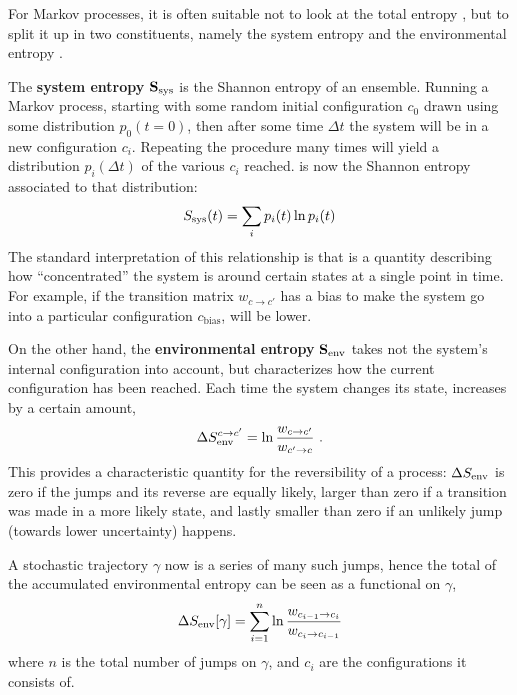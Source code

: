 For Markov processes, it is often suitable not to look at the total entropy \STot{}, but to split it up in two constituents, namely the system entropy \SSys{} and the environmental entropy \SEnv{}.

The \textbf{system entropy} \(\mathbf{S_\text{sys}{}}\) is the Shannon entropy of an ensemble. Running a Markov process, starting with some random initial configuration \(c_0\) drawn using some distribution \(p_0(t=0)\), then after some time \(\Delta t\) the system will be in a new configuration \(c_i\). Repeating the procedure many times will yield a distribution \(p_i(\Delta t)\) of the various \(c_i\) reached. \SSys{} is now the Shannon entropy associated to that distribution:
%
\begin{align}
	S_\text{sys}(t) = \sum_i p_i(t)\ln p_i(t)
\end{align}
%
The standard interpretation of this relationship is that \SSys{} is a quantity describing how ``concentrated'' the system is around certain states at a single point in time. For example, if the transition matrix \(w_{c\to c'}\) has a bias to make the system go into a particular configuration \(c_\text{bias}\), \SSys will be lower.

On the other hand, the \textbf{environmental entropy} \(\mathbf{S_\text{env}{}}\) takes not the system's internal configuration into account, but characterizes how the current configuration has been reached. Each time the system changes its state, \SEnv{} increases by a certain amount,
%
\begin{align}
	\Delta S_\text{env}^{c\to c'} = \ln\frac{w_{c\to c'}}{w_{c'\to c}} ~.
\end{align}
%
This provides a characteristic quantity for the reversibility of a process: \(\Delta S_\text{env}\) is zero if the jumps and its reverse are equally likely, larger than zero if a transition was made in a more likely state, and lastly smaller than zero if an unlikely jump (towards lower uncertainty) happens.

A stochastic trajectory \(\gamma\) now is a series of many such jumps, hence the total of the accumulated environmental entropy can be seen as a functional on \(\gamma\),
%
\begin{align}
	\label{eqn:SEnv rate jump functional}
	\Delta S_\text{env}[\gamma] = \sum_{i=1}^n\ln\frac{w_{c_{i-1}\to c_i}}{w_{c_i\to c_{i-1}}}
\end{align}
%
where \(n\) is the total number of jumps on \(\gamma\), and \(c_i\) are the configurations it consists of.




